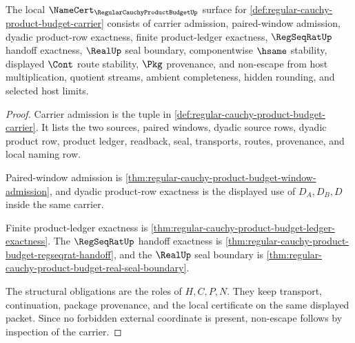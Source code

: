 \begin{theorem}
\label{thm:regular-cauchy-product-budget-namecert-obligations}
The local $\NameCert_{\RegularCauchyProductBudgetUp}$ surface for \autoref{def:regular-cauchy-product-budget-carrier} consists of carrier admission, paired-window admission, dyadic product-row exactness, finite product-ledger exactness, $\RegSeqRatUp$ handoff exactness, $\RealUp$ seal boundary, componentwise $\hsame$ stability, displayed $\Cont$ route stability, $\Pkg$ provenance, and non-escape from host multiplication, quotient streams, ambient completeness, hidden rounding, and selected host limits.
\end{theorem}
\begin{proof}
Carrier admission is the tuple in \autoref{def:regular-cauchy-product-budget-carrier}. It lists the two sources, paired windows, dyadic source rows, dyadic product row, product ledger, readback, seal, transports, routes, provenance, and local naming row.

Paired-window admission is \autoref{thm:regular-cauchy-product-budget-window-admission}, and dyadic product-row exactness is the displayed use of $D_A,D_B,D$ inside the same carrier.

Finite product-ledger exactness is \autoref{thm:regular-cauchy-product-budget-ledger-exactness}. The $\RegSeqRatUp$ handoff exactness is \autoref{thm:regular-cauchy-product-budget-regseqrat-handoff}, and the $\RealUp$ seal boundary is \autoref{thm:regular-cauchy-product-budget-real-seal-boundary}.

The structural obligations are the roles of $H,C,P,N$. They keep transport, continuation, package provenance, and the local certificate on the same displayed packet. Since no forbidden external coordinate is present, non-escape follows by inspection of the carrier.
\end{proof}

